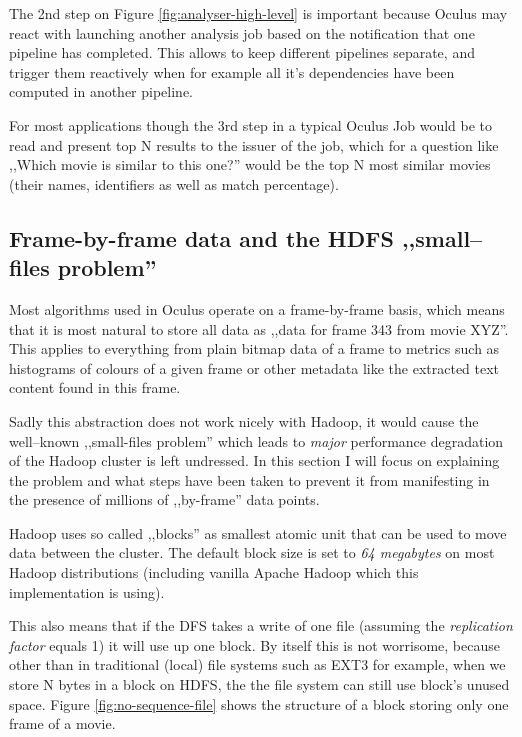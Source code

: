 The 2nd step on Figure \ref{fig:analyser-high-level} is important because Oculus may react with launching another analysis job based on the notification that one pipeline has completed. This allows to keep different pipelines separate, and trigger them reactively when for example all it's dependencies have been computed in another pipeline.

For most applications though the 3rd step in a typical Oculus Job would be to read and present top N results to the issuer of the job, which for a question like ,,Which movie is similar to this one?'' would be the top N most similar movies (their names, identifiers as well as match percentage).

\subsection{Frame-by-frame data and the HDFS ,,small--files problem''}
\label{sec:sequence-files}
Most algorithms used in Oculus operate on a frame-by-frame basis, which means that it is most natural to store all data as ,,data for frame 343 from movie XYZ''.
This applies to everything from plain bitmap data of a frame to metrics such as histograms of colours of a given frame or other metadata like the extracted text content found in this frame.

Sadly this abstraction does not work nicely with Hadoop, it would cause the well--known ,,small-files problem'' which leads to \textit{major} performance degradation of the Hadoop cluster is left undressed. In this section I will focus on explaining the problem and what steps have been taken to prevent it from manifesting in the presence of millions of ,,by-frame'' data points.

Hadoop uses so called ,,blocks'' as smallest atomic unit that can be used to move data between the cluster.
The default block size is set to \textit{64 megabytes} on most Hadoop distributions (including vanilla Apache Hadoop which this implementation is using).

This also means that if the DFS takes a write of one file (assuming the \textit{replication factor} equals 1) it will use up one block.
By itself this is not worrisome, because other than in traditional (local) file systems such as EXT3 for example, when we store N bytes in a block on HDFS,
the the file system can still use block's unused space. Figure \ref{fig:no-sequence-file} shows the structure of a block storing only one frame of a movie.


